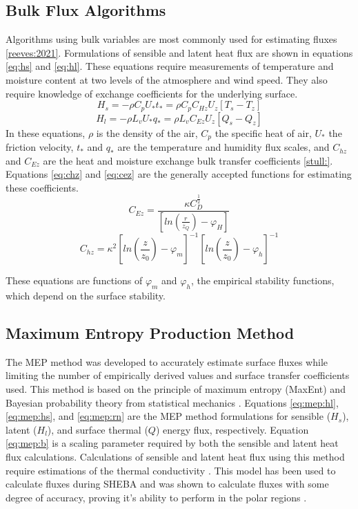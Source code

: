 \subsection{Bulk Flux Algorithms}
Algorithms using bulk variables are most commonly used for estimating fluxes \ref{reeves:2021}. Formulations of sensible and latent heat flux are shown in equations \ref{eq:hs} and \ref{eq:hl}. These equations require measurements of temperature and moisture content at two levels of the atmosphere and wind speed. They also require knowledge of exchange coefficients for the underlying surface.
\begin{equation}\label{eq:hs}
H_{s} = - \rho C_{p} U_{*} t_{*} = \rho C_{p} C_{Hz} U_{z} [T_{s} - T_{z}]
\end{equation}
\begin{equation}\label{eq:hl}
H_{l} = - \rho L_{v} U_{*} q_{*} = \rho L_{v} C_{Ez} U_{z} [Q_{s} - Q_{z}] 
\end{equation}
In these equations, $\rho$ is the density of the air, $C_{p}$ the specific heat of air, $U_{*}$ the friction velocity, $t_{*}$ and $q_{*}$ are the temperature and humidity flux scales, and $C_{hz}$ and $C_{Ez}$ are the heat and moisture exchange bulk transfer coefficients \ref{stull:}. Equations \ref{eq:chz} and \ref{eq:cez} are the generally accepted functions for estimating these coefficients. 
\begin{equation}\label{eq:cez}
C_{Ez} = \frac{\kappa C_{D}^{\frac{1}{2}}}{[ln(\frac{r}{z_{Q}})-\varphi_{H}]}
\end{equation}
\begin{equation}\label{eq:chz}
C_{hz} =  \kappa^{2} \left[ ln \left( \frac{z}{z_{0}} \right) - \varphi_{m} \right] ^{-1} \left[ ln \left( \frac{z}{z_{0}} \right) - \varphi_{h} \right] ^{-1}
\end{equation}

These equations are functions of $\varphi_{m}$ and $\varphi_{h}$, the empirical stability functions, which depend on the surface stability. 

\subsection{Maximum Entropy Production Method} 
The MEP method was developed to accurately estimate surface fluxes while limiting the number of empirically derived values and surface transfer coefficients used. This method is based on the principle of maximum entropy (MaxEnt) and Bayesian probability theory from statistical mechanics \cite{dewar:2004, wang:2014}. Equations \ref{eq:mep:hl}, \ref{eq:mep:hs}, and \ref{eq:mep:rn} are the MEP method formulations for sensible ($H_{s}$), latent ($H_{l}$), and surface thermal ($Q$) energy flux, respectively. Equation \ref{eq:mep:b} is a scaling parameter required by both the sensible and latent heat flux calculations. Calculations of sensible and latent heat flux using this method require estimations of the thermal conductivity \cite{wang:2014}. This model has been used to calculate fluxes during SHEBA and was shown to calculate fluxes with some degree of accuracy, proving it's ability to perform in the polar regions \cite{wang:2014}.

